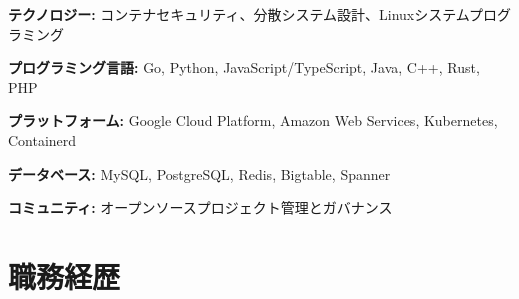 \documentclass{article}
\begin{document}
\begin{list}{}{
    \setlength{\leftmargin}{0cm}	%
    \setlength{\parsep}{0cm}
}
    \item \textbf{テクノロジー:} コンテナセキュリティ、分散システム設計、Linuxシステムプログラミング
    \item \textbf{プログラミング言語:} Go, Python, JavaScript/TypeScript, Java, C++, Rust, PHP
    \item \textbf{プラットフォーム:} Google Cloud Platform, Amazon Web Services, Kubernetes, Containerd
    \item \textbf{データベース:} MySQL, PostgreSQL, Redis, Bigtable, Spanner
    \item \textbf{コミュニティ:} オープンソースプロジェクト管理とガバナンス
\end{list}

\section{職務経歴}
\end{document}
